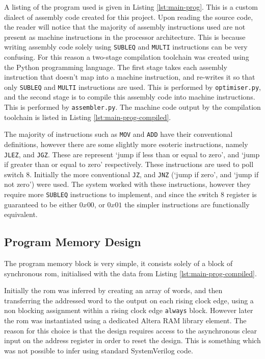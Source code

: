 A listing of the program used is given in Listing \ref{lst:main-prog}. This is a custom dialect of assembly code created for this project. Upon reading the source code, the reader will notice that the majority of assembly instructions used are not present as machine instructions in the processor architecture. This is because writing assembly code solely using \texttt{SUBLEQ} and \texttt{MULTI} instructions can be very confusing. For this reason a two-stage compilation toolchain was created using the Python programming language. The first stage takes each assembly instruction that doesn't map into a machine instruction, and re-writes it so that only \texttt{SUBLEQ} and \texttt{MULTI} instructions are used. This is performed by \texttt{optimiser.py}, and the second stage is to compile this assembly code into machine instructions. This is performed by \texttt{assembler.py}. The machine code output by the compilation toolchain is listed in Listing \ref{lst:main-prog-compiled}.

The majority of instructions such as \texttt{MOV} and \texttt{ADD} have their conventional definitions, however there are some slightly more esoteric instructions, namely \texttt{JLEZ}, and \texttt{JGZ}. These are represent `jump if less than or equal to zero', and `jump if greater than or equal to zero' respectively. These instructions are used to poll switch 8. Initially the more conventional \texttt{JZ}, and \texttt{JNZ} (`jump if zero', and `jump if not zero') were used. The system worked with these instructions, however they require more \texttt{SUBLEQ} instructions to implement, and since the switch 8 register is guaranteed to be either $0x00$, or $0x01$ the simpler instructions are functionally equivalent.

\subsection{Program Memory Design}
The program memory block is very simple, it consists solely of a block of synchronous \gls{rom}, initialised with the data from Listing \ref{lst:main-prog-compiled}.

Initially the \gls{rom} was inferred by creating an array of words, and then transferring the addressed word to the output on each rising clock edge, using a non blocking assignment within a rising clock edge \texttt{always} block. However later the \gls{rom} was instantiated using a dedicated Altera RAM library element. The reason for this choice is that the design requires access to the asynchronous clear input on the address register in order to reset the design. This is something which was not possible to infer using standard SystemVerilog code.

